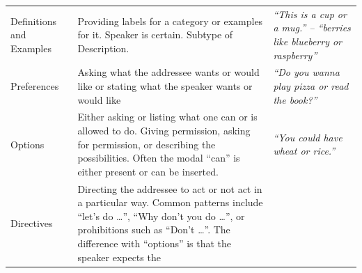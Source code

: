 \documentclass[floatsintext,man]{apa6}
\theoremstyle{definition}
\theoremstyle{definition}
\theoremstyle{definition}
\theoremstyle{remark}
\begin{document}
\begin{longtable}[]{@{}lll@{}}
\begin{minipage}[t]{0.14\columnwidth}\raggedright\strut
Definitions and Examples\strut
\end{minipage} & \begin{minipage}[t]{0.44\columnwidth}\raggedright\strut
Providing labels for a category or examples for it. Speaker is certain.
Subtype of Description.\strut
\end{minipage} & \begin{minipage}[t]{0.33\columnwidth}\raggedright\strut
\emph{\enquote{This is a cup or a mug.} -- \enquote{berries like
blueberry or raspberry}}\strut
\end{minipage}\tabularnewline
\begin{minipage}[t]{0.14\columnwidth}\raggedright\strut
Preferences\strut
\end{minipage} & \begin{minipage}[t]{0.44\columnwidth}\raggedright\strut
Asking what the addressee wants or would like or stating what the
speaker wants or would like\strut
\end{minipage} & \begin{minipage}[t]{0.33\columnwidth}\raggedright\strut
\emph{\enquote{Do you wanna play pizza or read the book?}}\strut
\end{minipage}\tabularnewline
\begin{minipage}[t]{0.14\columnwidth}\raggedright\strut
Options\strut
\end{minipage} & \begin{minipage}[t]{0.44\columnwidth}\raggedright\strut
Either asking or listing what one can or is allowed to do. Giving
permission, asking for permission, or describing the possibilities.
Often the modal \enquote{can} is either present or can be
inserted.\strut
\end{minipage} & \begin{minipage}[t]{0.33\columnwidth}\raggedright\strut
\emph{\enquote{You could have wheat or rice.}}\strut
\end{minipage}\tabularnewline
\begin{minipage}[t]{0.14\columnwidth}\raggedright\strut
Directives\strut
\end{minipage} & \begin{minipage}[t]{0.44\columnwidth}\raggedright\strut
Directing the addressee to act or not act in a particular way. Common
patterns include \enquote{let's do \ldots{}}, \enquote{Why don't you do
\ldots{}}, or prohibitions such as \enquote{Don't \ldots{}}. The
difference with \enquote{options} is that the speaker expects the

\end{minipage}
\end{longtable}
\end{document}
